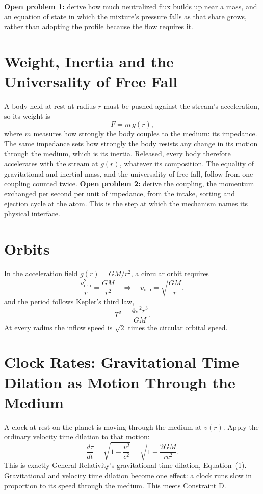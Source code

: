 \documentclass[11pt,a4paper]{article}
\begin{document}
\textbf{Open problem 1:} derive how much neutralized flux builds up near a mass, and an equation of state in which the mixture's pressure falls as that share grows, rather than adopting the profile because the flow requires it.

\section{Weight, Inertia and the Universality of Free Fall}
A body held at rest at radius $r$ must be pushed against the stream's acceleration, so its weight is
\begin{equation}
F = m\, g(r),
\end{equation}
where $m$ measures how strongly the body couples to the medium: its impedance. The same impedance sets how strongly the body resists any change in its motion through the medium, which is its inertia. Released, every body therefore accelerates with the stream at $g(r)$, whatever its composition. The equality of gravitational and inertial mass, and the universality of free fall, follow from one coupling counted twice. \textbf{Open problem 2:} derive the coupling, the momentum exchanged per second per unit of impedance, from the intake, sorting and ejection cycle at the atom. This is the step at which the mechanism names its physical interface.

\section{Orbits}
In the acceleration field $g(r) = GM/r^2$, a circular orbit requires
\begin{equation}
\frac{v_{\text{orb}}^2}{r} = \frac{GM}{r^2} \quad\Longrightarrow\quad v_{\text{orb}} = \sqrt{\frac{GM}{r}},
\end{equation}
and the period follows Kepler's third law,
\begin{equation}
T^2 = \frac{4\pi^2 r^3}{GM}.
\end{equation}
At every radius the inflow speed is $\sqrt{2}$ times the circular orbital speed.

\section{Clock Rates: Gravitational Time Dilation as Motion Through the Medium}
\label{sec:clocks}
A clock at rest on the planet is moving through the medium at $v(r)$. Apply the ordinary velocity time dilation to that motion:
\begin{equation}
\frac{d\tau}{dt} = \sqrt{1 - \frac{v^2}{c^2}} = \sqrt{1 - \frac{2GM}{rc^2}}.
\end{equation}
This is exactly General Relativity's gravitational time dilation, Equation~(1). Gravitational and velocity time dilation become one effect: a clock runs slow in proportion to its speed through the medium. This meets Constraint D.
\end{document}
